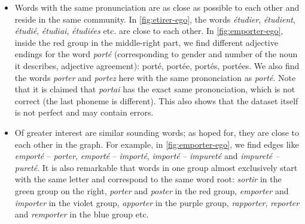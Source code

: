 \begin{itemize}[leftmargin=0cm]
    \item Words with the same pronunciation are as close as possible to each other and reside in the same community. In \autoref{fig:etirer-ego}, the words \textit{étudier}, \textit{étudient}, \textit{étudié}, \textit{étudiai}, \textit{étudiées} etc. are close to each other. In \autoref{fig:emporter-ego}, inside the red group in the middle-right part, we find different adjective endings for the word \textit{porté} (corresponding to gender and number of the noun it describes, \ie adjective agreement): porté, portée, portés, portées. We also find the words \textit{porter} and \textit{portez} here with the same prononciation as \textit{porté}. Note that it is claimed that \textit{portai} has the exact same prononciation, which is not correct (the last phoneme is different). This also shows that the dataset itself is not perfect and may contain errors. 
    
    \item Of greater interest are similar sounding words; as hoped for, they are close to each other in the graph. For example, in \autoref{fig:emporter-ego}, we find edges like \textit{emporté} -- \textit{porter}, \textit{emporté} -- \textit{importé}, \textit{importé} -- \textit{impureté} and \textit{impureté -- pureté}. It is also remarkable that words in one group almost exclusively start with the same letter and correspond to the same word root: \textit{sortir} in the green group on the right, \textit{porter} and \textit{poster} in the red group, \textit{emporter} and \textit{importer} in the violet group, \textit{apporter} in the purple group, \textit{rapporter}, \textit{reporter} and \textit{remporter} in the blue group etc.
    

\end{itemize}
